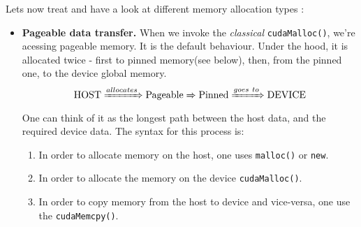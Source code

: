 {%
%
%
%
%

Lets now treat and have a look at different memory allocation types \cite{memory_model}:

\begin{itemize}
   \setlength\itemsep{-0.5em}

   \item \textbf{Pageable data transfer.} When we invoke the \textit{classical} \verb|cudaMalloc()|, 
   we're acessing pageable memory. It is the default behaviour. 
    Under the hood, it is allocated twice - first to pinned memory(see below), 
   then, from the pinned one, to the device global memory. 
      \begin{equation}
        \text{HOST}\xRightarrow{allocates}\text{Pageable} 
        \xRightarrow{} \text{Pinned} \xRightarrow{goes\ to}\text{DEVICE}
      \end{equation}
    One can think of it as the longest path between the host data, 
   and the required device data.
    The syntax for this process is:
    \begin{enumerate}
      \item In order to allocate memory on the host, one uses \verb|malloc()| or \verb|new|.
      \item In order to allocate the memory on the device \verb|cudaMalloc()|.
      \item In order to copy memory from the host to device and vice-versa, one use the \verb|cudaMemcpy()|.
    \end{enumerate}


\end{itemize}}
